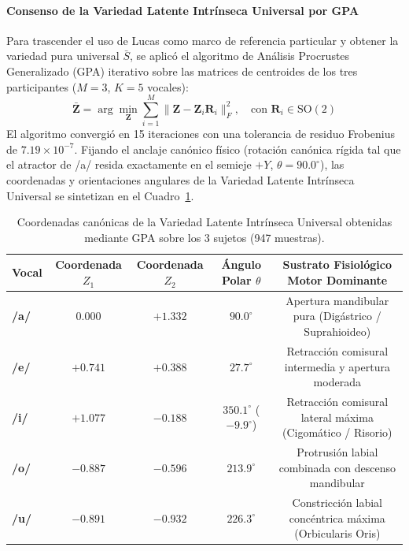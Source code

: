 \documentclass[11pt,a4paper,openany]{book}
\theoremstyle{definition}
\begin{document}
\paragraph{Consenso de la Variedad Latente Intrínseca Universal por GPA}
Para trascender el uso de Lucas como marco de referencia particular y obtener la variedad pura universal $\bar{S}$, se aplicó el algoritmo de Análisis Procrustes Generalizado (GPA) iterativo sobre las matrices de centroides de los tres participantes ($M=3$, $K=5$ vocales):
\begin{equation}
\bar{\mathbf{Z}} = \arg\min_{\mathbf{Z}} \sum_{i=1}^M \|\mathbf{Z} - \mathbf{Z}_i \mathbf{R}_i\|_F^2, \quad \text{con } \mathbf{R}_i \in \text{SO}(2)
\end{equation}
El algoritmo convergió en 15 iteraciones con una tolerancia de residuo Frobenius de $7.19 \times 10^{-7}$. Fijando el anclaje canónico físico (rotación canónica rígida tal que el atractor de /a/ resida exactamente en el semieje $+Y$, $\theta = 90.0^\circ$), las coordenadas y orientaciones angulares de la Variedad Latente Intrínseca Universal se sintetizan en el Cuadro~\ref{tab:variedad_intrinseca_gpa}.

\begin{table}[H]
\centering
\small
\begin{tabular}{lcccc}
\toprule
\textbf{Vocal} & \textbf{Coordenada $Z_1$} & \textbf{Coordenada $Z_2$} & \textbf{Ángulo Polar $\theta$} & \textbf{Sustrato Fisiológico Motor Dominante} \\
\midrule
\textbf{/a/} & $0.000$ & $+1.332$ & $90.0^\circ$ & Apertura mandibular pura (Digástrico / Suprahioideo) \\
\textbf{/e/} & $+0.741$ & $+0.388$ & $27.7^\circ$ & Retracción comisural intermedia y apertura moderada \\
\textbf{/i/} & $+1.077$ & $-0.188$ & $350.1^\circ$ ($-9.9^\circ$) & Retracción comisural lateral máxima (Cigomático / Risorio) \\
\textbf{/o/} & $-0.887$ & $-0.596$ & $213.9^\circ$ & Protrusión labial combinada con descenso mandibular \\
\textbf{/u/} & $-0.891$ & $-0.932$ & $226.3^\circ$ & Constricción labial concéntrica máxima (Orbicularis Oris) \\
\bottomrule
\end{tabular}
\caption{Coordenadas canónicas de la Variedad Latente Intrínseca Universal obtenidas mediante GPA sobre los 3 sujetos (947 muestras).}
\label{tab:variedad_intrinseca_gpa}
\end{table}
\end{document}
